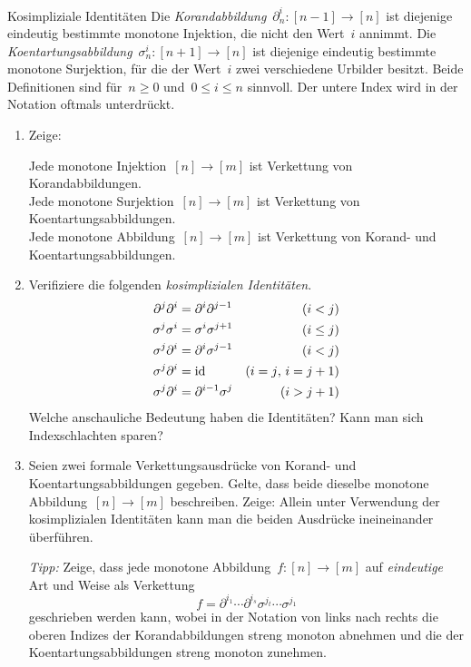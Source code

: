 \documentclass{uebblatt}
\begin{document}

\begin{aufgabe}{Kosimpliziale Identitäten}
Die \emph{Korandabbildung}~$\partial^i_n : [n-1] \to
[n]$ ist diejenige eindeutig bestimmte monotone Injektion, die nicht den
Wert~$i$ annimmt. Die \emph{Koentartungsabbildung}~$\sigma^i_n : [n+1] \to [n]$
ist diejenige eindeutig bestimmte monotone Surjektion, für die der Wert~$i$
zwei verschiedene Urbilder besitzt. Beide Definitionen sind für~$n \geq 0$
und~$0 \leq i \leq n$ sinnvoll. Der untere Index wird in der Notation oftmals
unterdrückt.
\begin{enumerate}
\item Zeige:

Jede monotone Injektion~\tabto{4.55cm}$[n] \to [m]$ ist Verkettung
von Korandabbildungen. \\
Jede monotone Surjektion~\tabto{4.55cm}$[n] \to [m]$ ist
Verkettung von Koentartungsabbildungen. \\
Jede monotone Abbildung~\tabto{4.55cm}$[n] \to [m]$
ist Verkettung von Korand- und Koentartungsabbildungen.

\item Verifiziere die folgenden \emph{kosimplizialen Identitäten}.
\begin{align*}
  \partial^j \partial^i &= \partial^i \partial^{j-1} & \text{($i < j$)} \\
  \sigma^j \sigma^i &= \sigma^i \sigma^{j+1} & \text{($i \leq j$)} \\
  \sigma^j \partial^i &= \partial^i \sigma^{j-1} & \text{($i < j$)} \\
  \sigma^j \partial^i &= \mathrm{id} & \text{($i = j$, $i = j+1$)} \\
  \sigma^j \partial^i &= \partial^{i-1} \sigma^j & \text{($i > j + 1$)} 
\end{align*}
Welche anschauliche Bedeutung haben die Identitäten? Kann man
sich Indexschlachten sparen?

\item Seien zwei formale Verkettungsausdrücke von Korand- und
Koentartungsabbildungen gegeben. Gelte, dass beide dieselbe monotone
Abbildung~$[n] \to [m]$ beschreiben. Zeige: Allein unter Verwendung der
kosimplizialen Identitäten kann man die beiden Ausdrücke ineineinander
überführen.

\emph{Tipp:} Zeige, dass jede monotone Abbildung~$f : [n] \to [m]$ auf
\emph{eindeutige} Art und Weise als Verkettung
\[ f = \partial^{i_1} \cdots \partial^{i_s} \sigma^{j_t} \cdots \sigma^{j_1} \]
geschrieben werden kann, wobei in der Notation von links nach rechts die oberen
Indizes der Korandabbildungen streng monoton abnehmen und die der
Koentartungsabbildungen streng monoton zunehmen.
\end{enumerate}


\end{aufgabe}
\end{document}
